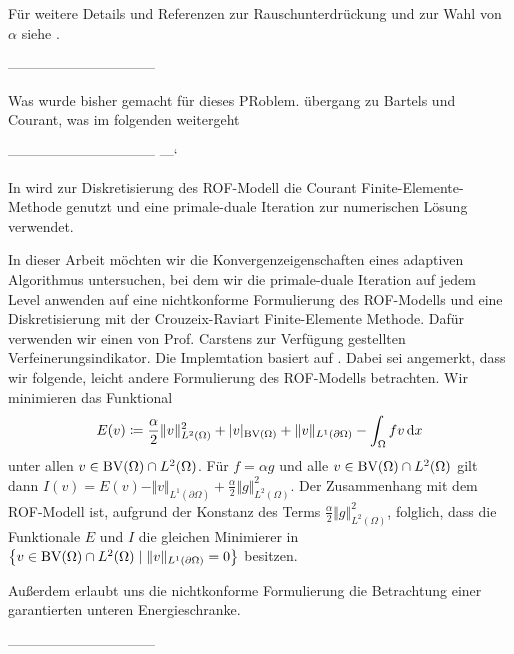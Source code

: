 Für weitere Details und Referenzen zur Rauschunterdrückung und zur Wahl von
$\alpha$ siehe \cite{Get12}.

\medskip
--------------------------------
\medskip

Was wurde bisher gemacht für dieses PRoblem. 
übergang zu Bartels und Courant, was im folgenden weitergeht

\medskip
--------------------------------
---`\cite[Kapitel~10.1.3]{Bar15}
\medskip

In \cite[Kapitel 10]{Bar15} wird zur Diskretisierung des
ROF-Modell die Courant Finite-Elemente-Methode genutzt und eine primale-duale
Iteration zur numerischen Lösung verwendet.

In dieser Arbeit möchten wir die Konvergenzeigenschaften eines adaptiven
Algorithmus untersuchen, bei dem wir die primale-duale Iteration auf jedem
Level anwenden auf eine nichtkonforme Formulierung des ROF-Modells und eine
Diskretisierung mit der Crouzeix-Raviart Finite-Elemente Methode.
Dafür verwenden wir einen von Prof. Carstens zur Verfügung gestellten 
Verfeinerungsindikator. Die Implemtation basiert auf \cite{Car09a}.
Dabei sei angemerkt, dass wir folgende, leicht andere Formulierung des 
ROF-Modells betrachten. Wir minimieren das Funktional
\begin{align*}
  E(v)\coloneqq \frac{\alpha}{2}\Vert v\Vert_{L^2(\Omega)}^2 + |v|_{\textup{BV}(\Omega)}
  +\Vert v\Vert_{L^1(\partial\Omega)}-\int_\Omega fv\,\mathrm{d}x
\end{align*}
unter allen $v\in\textup{BV}(\Omega)\cap L^2(\Omega)$.
Für $f = \alpha g$ und alle $v\in \textup{BV}(\Omega)\cap
L^2(\Omega)$ gilt dann $I(v) =
E(v) - \Vert v\Vert_{L^1(\partial \Omega)}+ \frac{\alpha}{2}\Vert
g\Vert_{L^2(\Omega)}^2$. 
Der Zusammenhang mit dem ROF-Modell ist, aufgrund der Konstanz des Terms
$\frac{\alpha}{2}\Vert g\Vert_{L^2(\Omega)}^2$, folglich, dass die Funktionale
$E$ und $I$ die gleichen Minimierer in $\left\{v\in\textup{BV}(\Omega)\cap
L^2(\Omega)\mid \Vert v\Vert_{L^1(\partial\Omega)}=0\right\}$ besitzen.

Außerdem erlaubt uns die nichtkonforme Formulierung die Betrachtung einer
garantierten unteren Energieschranke.

\medskip
--------------------------------
\medskip

